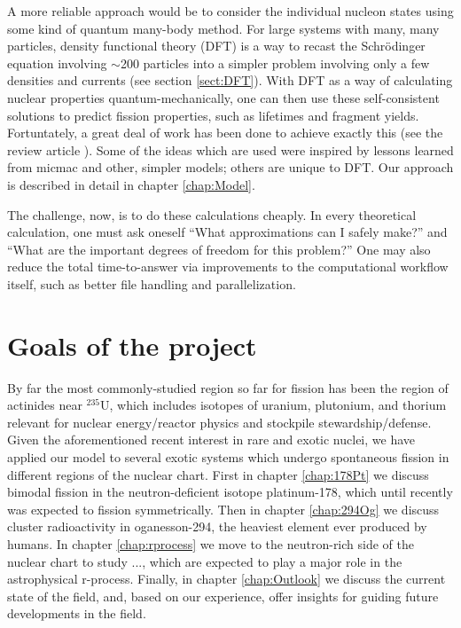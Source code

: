 A more reliable approach would be to consider the individual nucleon states using some kind of quantum many-body method. For large systems with many, many particles, density functional theory (DFT) is a way to recast the Schr\"{o}dinger equation involving $\sim$200 particles into a simpler problem involving only a few densities and currents (see section \ref{sect:DFT}). With DFT as a way of calculating nuclear properties quantum-mechanically, one can then use these self-consistent solutions to predict fission properties, such as lifetimes and fragment yields. Fortuntately, a great deal of work has been done to achieve exactly this (see the review article \cite{Schunck2016}). Some of the ideas which are used were inspired by lessons learned from micmac and other, simpler models; others are unique to DFT. Our approach is described in detail in chapter \ref{chap:Model}.

The challenge, now, is to do these calculations cheaply. In every theoretical calculation, one must ask oneself ``What approximations can I safely make?'' and ``What are the important degrees of freedom for this problem?'' One may also reduce the total time-to-answer via improvements to the computational workflow itself, such as better file handling and parallelization.

\section{Goals of the project}
By far the most commonly-studied region so far for fission has been the region of actinides near $^{235}$U, which includes isotopes of uranium, plutonium, and thorium relevant for nuclear energy/reactor physics and stockpile stewardship/defense. Given the aforementioned recent interest in rare and exotic nuclei, we have applied our model to several exotic systems which undergo spontaneous fission in different regions of the nuclear chart. First in chapter \ref{chap:178Pt} we discuss bimodal fission in the neutron-deficient isotope platinum-178, which until recently was expected to fission symmetrically. Then in chapter \ref{chap:294Og} we discuss cluster radioactivity in oganesson-294, the heaviest element ever produced by humans. In chapter \ref{chap:rprocess} we move to the neutron-rich side of the nuclear chart to study ..., which are expected to play a major role in the astrophysical r-process. Finally, in chapter \ref{chap:Outlook} we discuss the current state of the field, and, based on our experience, offer insights for guiding future developments in the field.